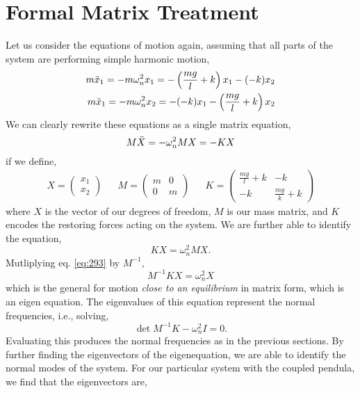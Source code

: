 \documentclass{book}
\begin{document}
\section{Formal Matrix Treatment}
Let us consider the equations of motion again, assuming that all parts of the system are performing simple harmonic motion,
\begin{align}
	m\Ddot{x}_1 = -m\omega_n^2x_1 = -\left(\frac{mg}{l} + k\right)x_1 -(-k)x_2\label{eq:12} \\
	m\Ddot{x}_1 = -m\omega_n^2x_2 = -(-k)x_1 -\left(\frac{mg}{l} + k\right)x_2 \label{eq:22} \\
\end{align}
We can clearly rewrite these equations as a single matrix equation,
\begin{equation}
	M\Ddot{X} = -\omega_n^2MX = -KX
\end{equation}
if we define,
\begin{align}
	X = \begin{pmatrix}
		x_1 \\ x_2
	\end{pmatrix} && M = \begin{pmatrix}
	m & 0 \\ 0 & m
	\end{pmatrix} && K = \begin{pmatrix}
	\frac{mg}{l}+k & -k \\
	-k & \frac{mg}{k}+k
	\end{pmatrix}
\end{align}
where $X$ is the vector of our degrees of freedom, $M$ is our mass matrix, and $K$ encodes the restoring forces acting on the system. We are further able to identify the equation,
\begin{equation}
	KX = \omega_n^2MX. \label{eq:293}
\end{equation}
Mutliplying eq. \eqref{eq:293} by $M^{-1}$,
\begin{equation}
	\boxed{M^{-1}K X = \omega_n ^2X} \label{eq:matrix eq motion}
\end{equation}
which is the general for motion \textit{close to an equilibrium} in matrix form, which is an eigen equation. The eigenvalues of this equation represent the normal frequencies, i.e., solving,
\begin{equation}
	\det{M^{-1}K - \omega_n^2I} = 0.
\end{equation} 
Evaluating this produces the normal frequencies as in the previous sections. By further finding the eigenvectors of the eigenequation, we are able to identify the normal modes of the system. For our particular system with the coupled pendula, we find that the eigenvectors are,
\end{document}
